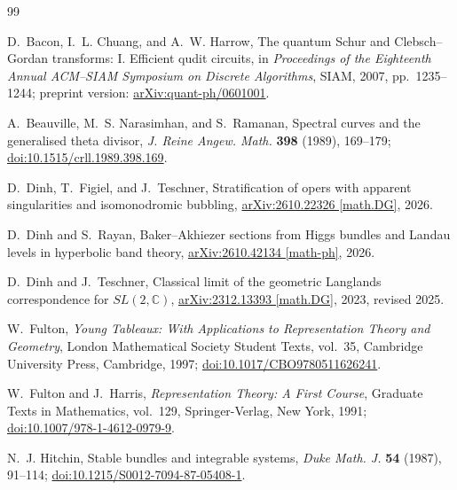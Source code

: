 \documentclass[11pt]{article}
\theoremstyle{definition}
\theoremstyle{remark}
\newcommand{\C}{\mathbb C}
\begin{document}
\begingroup
\small
\raggedright
\begin{thebibliography}{99}

D.~Bacon, I.~L. Chuang, and A.~W. Harrow,
\newblock The quantum Schur and Clebsch--Gordan transforms: I. Efficient qudit circuits,
\newblock in \emph{Proceedings of the Eighteenth Annual ACM--SIAM Symposium on Discrete Algorithms}, SIAM, 2007, pp.~1235--1244;
preprint version: \href{https://arxiv.org/abs/quant-ph/0601001}{arXiv:quant-ph/0601001}.

A.~Beauville, M.~S. Narasimhan, and S.~Ramanan,
\newblock Spectral curves and the generalised theta divisor,
\newblock \emph{J. Reine Angew. Math.} \textbf{398} (1989), 169--179;
\href{https://doi.org/10.1515/crll.1989.398.169}{doi:10.1515/crll.1989.398.169}.

D.~Dinh, T.~Figiel, and J.~Teschner,
\newblock Stratification of opers with apparent singularities and isomonodromic bubbling,
\newblock \href{https://arxiv.org/abs/2610.22326}{arXiv:2610.22326 [math.DG]}, 2026.

D.~Dinh and S.~Rayan,
\newblock Baker--Akhiezer sections from Higgs bundles and Landau levels in hyperbolic band theory,
\newblock \href{https://arxiv.org/abs/2610.42134}{arXiv:2610.42134 [math-ph]}, 2026.

D.~Dinh and J.~Teschner,
\newblock Classical limit of the geometric Langlands correspondence for $SL(2,\C)$,
\newblock \href{https://arxiv.org/abs/2312.13393}{arXiv:2312.13393 [math.DG]}, 2023, revised 2025.

W.~Fulton,
\newblock \emph{Young Tableaux: With Applications to Representation Theory and Geometry},
\newblock London Mathematical Society Student Texts, vol.~35, Cambridge University Press, Cambridge, 1997;
\href{https://doi.org/10.1017/CBO9780511626241}{doi:10.1017/CBO9780511626241}.

W.~Fulton and J.~Harris,
\newblock \emph{Representation Theory: A First Course},
\newblock Graduate Texts in Mathematics, vol.~129, Springer-Verlag, New York, 1991;
\href{https://doi.org/10.1007/978-1-4612-0979-9}{doi:10.1007/978-1-4612-0979-9}.

N.~J. Hitchin,
\newblock Stable bundles and integrable systems,
\newblock \emph{Duke Math. J.} \textbf{54} (1987), 91--114;
\href{https://doi.org/10.1215/S0012-7094-87-05408-1}{doi:10.1215/S0012-7094-87-05408-1}.


\end{thebibliography}
\end{document}
